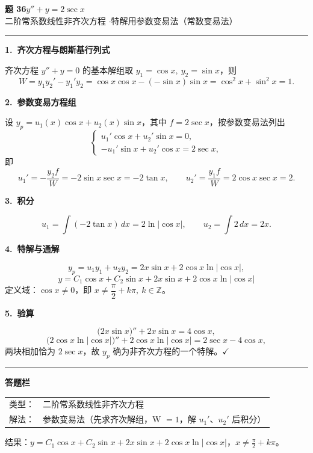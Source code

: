 \documentclass[11pt,a4paper]{ctexart}
\begin{document}
{\color{mainblue}\Large\bfseries 题 36\quad $y''+y=2\sec x$}\\[2pt]
{\color{mainblue}\small 二阶常系数线性非齐次方程 \quad$\cdot$\quad 特解用参数变易法（常数变易法）}

\vspace{0.5em}
\noindent\rule{\linewidth}{0.6pt}

\textbf{1.\ 齐次方程与朗斯基行列式}

齐次方程 $y''+y=0$ 的基本解组取 $y_1=\cos x,\ y_2=\sin x$，则
\[
W=y_1y_2'-y_1'y_2=\cos x\cos x-(-\sin x)\sin x=\cos^2x+\sin^2x=1 .
\]

\textbf{2.\ 参数变易方程组}

设 $y_p=u_1(x)\cos x+u_2(x)\sin x$，其中 $f=2\sec x$，按参数变易法列出
\[
\begin{cases}
u_1'\cos x+u_2'\sin x=0,\\[2pt]
-u_1'\sin x+u_2'\cos x=2\sec x,
\end{cases}
\]
即
\[
u_1'=-\frac{y_2 f}{W}=-2\sin x\sec x=-2\tan x,\qquad
u_2'=\frac{y_1 f}{W}=2\cos x\sec x=2 .
\]

\textbf{3.\ 积分}

\[
u_1=\int(-2\tan x)\,dx=2\ln|\cos x|,\qquad
u_2=\int 2\,dx=2x .
\]

\textbf{4.\ 特解与通解}

\[
y_p=u_1y_1+u_2y_2=2x\sin x+2\cos x\ln|\cos x|,
\]
\[
\boxed{\;y=C_1\cos x+C_2\sin x+2x\sin x+2\cos x\ln|\cos x|\;}
\]
定义域：$\cos x\neq 0$，即 $x\neq\dfrac{\pi}{2}+k\pi,\ k\in\mathbb{Z}$。

\textbf{5.\ 验算}

\[
\bigl(2x\sin x\bigr)''+2x\sin x=4\cos x,
\]
\[
\bigl(2\cos x\ln|\cos x|\bigr)''+2\cos x\ln|\cos x|=2\sec x-4\cos x,
\]
两块相加恰为 $2\sec x$，故 $y_p$ 确为非齐次方程的一个特解。\hfill$\checkmark$

\vspace{0.6em}
\noindent\rule{\linewidth}{0.6pt}

\textbf{答题栏}\quad
\begin{tabular}{@{}ll@{}}
类型：& 二阶常系数线性非齐次方程\\
解法：& 参数变易法（先求齐次解组，W $=1$，解 $u_1'$、$u_2'$ 后积分）\\
\end{tabular}

\vspace{0.3em}
结果：$y=C_1\cos x+C_2\sin x+2x\sin x+2\cos x\ln|\cos x|$，$x\neq \frac{\pi}{2}+k\pi$。
\end{document}
